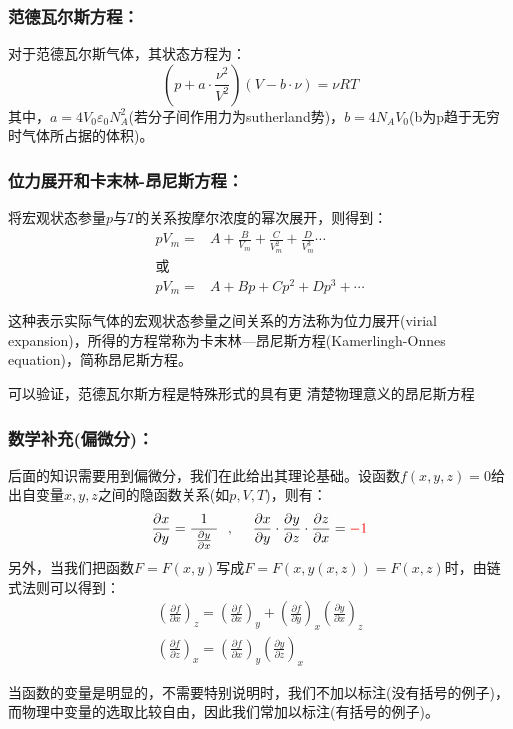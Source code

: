 \documentclass[zihao=-4,UTF8]{report}
\begin{document}
\subsubsection{范德瓦尔斯方程：}
对于范德瓦尔斯气体，其状态方程为：
\begin{equation}
    \left( p+a\cdot \frac{\nu ^2}{V^2} \right) \left( V-b \cdot \nu \right)  = \nu RT
\end{equation}
其中，$a = 4V_0\varepsilon_0N_A^2$(若分子间作用力为sutherland势)，$b = 4N_AV_0$(b为p趋于无穷时气体所占据的体积)。
\subsubsection{位力展开和卡末林-昂尼斯方程：}
将宏观状态参量$p$与$T$的关系按摩尔浓度的幂次展开，则得到：
\begin{align*}
    pV_m =& A + \frac{B}{V_m} + \frac{C}{V_m^2} + \frac{D}{V_m^3}\cdots\\
    \text{或}&\\
    pV_m =& A + Bp + Cp^2 +Dp^3 + \cdots 
\end{align*}\par
这种表示实际气体的宏观状态参量之间关系的方法称为位力展开(virial expansion)，所得的方程常称为卡末林—昂尼斯方程(Kamerlingh-Onnes equation)，简称昂尼斯方程。\par
{\color{gray}\small 可以验证，范德瓦尔斯方程是特殊形式的具有更
清楚物理意义的昂尼斯方程}
\subsubsection{数学补充(偏微分)：}
后面的知识需要用到偏微分，我们在此给出其理论基础。设函数$f(x,y,z) = 0$给出自变量$x,y,z$之间的隐函数关系(如$p,V,T$)，则有：
\begin{align*}
    \frac{\partial x}{\partial y} = \frac{1}{\ \frac{\partial y}{\partial x} \ }\ \  ,\ \ \ \ 
    \frac{\partial x}{\partial y}\cdot \frac{\partial y}{\partial z}\cdot \frac{\partial z}{\partial x} = {\textcolor{red}{-1}}
\end{align*}
另外，当我们把函数$F = F(x,y)$写成$F = F(x,y(x,z)) = F(x,z)$时，由链式法则可以得到：
\begin{gather*}
    \left(\frac{\partial f}{\partial x}\right)_z = \left(\frac{\partial f}{\partial x}\right)_y + \left(\frac{\partial f}{\partial y}\right)_x \left(\frac{\partial y}{\partial x}\right)_z \\
    \left(\frac{\partial f}{\partial z}\right)_x = \left(\frac{\partial f}{\partial x}\right)_y\left(\frac{\partial y}{\partial z}\right)_x
\end{gather*}\par
{\color{gray}\small 当函数的变量是明显的，不需要特别说明时，我们不加以标注(没有括号的例子)，而物理中变量的选取比较自由，因此我们常加以标注(有括号的例子)。}
\end{document}
